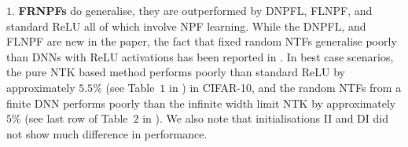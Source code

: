 $1.$ \textbf{FRNPFs}  do generalise, they are outperformed by DNPFL, FLNPF, and standard ReLU all of which involve NPF learning. While the DNPFL, and FLNPF are new in the paper, the fact that fixed random NTFs generalise poorly than DNNs with  ReLU activations has been reported in \cite{arora2019exact}. In best case scenarios, the pure NTK based method performs poorly than standard ReLU by approximately $5.5\%$ (see Table~$1$ in \cite{arora2019exact}) in CIFAR-10, and the random NTFs from a finite DNN performs poorly than the infinite width limit NTK by approximately $5\%$ (see last row of Table~$2$ in \cite{arora2019exact}). We also note that initialisations II and DI did not show much difference in performance.

